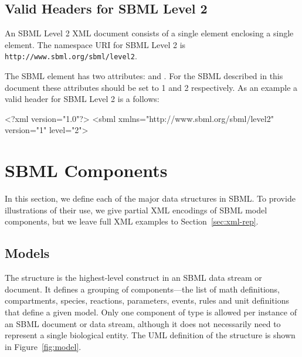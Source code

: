 \documentclass[10pt]{cekarticle}
\newcommand{\vref}[1]{\ref{#1}}
\begin{document}
\subsection{Valid Headers for SBML Level 2}
\label{sec:header}
An SBML Level 2 XML document consists of a single 
element enclosing a single  element.  The namespace
URI for SBML Level 2 is \texttt{http://www.sbml.org/sbml/level2}.

The SBML element has two attributes:  and
.  For the SBML described in this document these
attributes should be set to 1 and 2 respectively.  As an example a
valid header for SBML Level 2 is a follows:

\begin{example}
<?xml version="1.0"?>
<sbml xmlns="http://www.sbml.org/sbml/level2" version="1" level="2">
\end{example}

\section{SBML Components}
\label{sec:elements}

In this section, we define each of the major data structures in SBML. To
provide illustrations of their use, we give partial XML encodings of SBML
model components, but we leave full XML examples to
Section~\ref{sec:xml-rep}.


\subsection{Models}
\label{sec:model}

The  structure is the highest-level construct in an
SBML data stream or document.  It defines a grouping of
components---the list of math definitions, compartments, species,
reactions, parameters, events, rules and unit definitions that
define a given model. Only one component of type  is
allowed per instance of an SBML document or data stream, although
it does not necessarily need to represent a single biological
entity.  The UML definition of the  structure is
shown in Figure~\vref{fig:model}.
\end{document}
